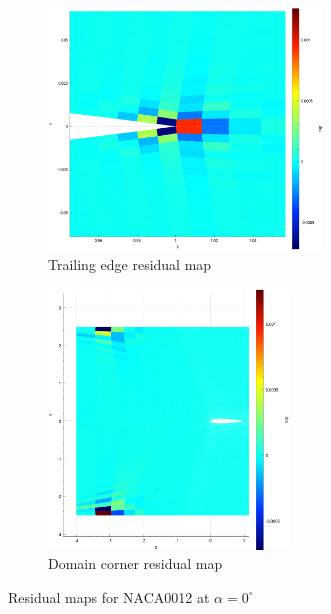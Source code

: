 \documentclass{article}
\begin{document}
\begin{figure}[H]
    \centering
    \begin{subfigure}{0.49\textwidth}
        \centering
        \includegraphics[width=0.8\textwidth]{figures/kutta.png}
        \caption{Trailing edge residual map}
        \label{fig:kutta}
    \end{subfigure}
    \begin{subfigure}{0.49\textwidth}
        \centering
        \includegraphics[width=0.7\textwidth]{figures/corner.png}
        \caption{Domain corner residual map}
        \label{fig:corners}
    \end{subfigure}
    \caption{Residual maps for NACA0012 at $\alpha = 0^\circ$}
    \label{fig:naca_residual_maps}
\end{figure}
\end{document}
